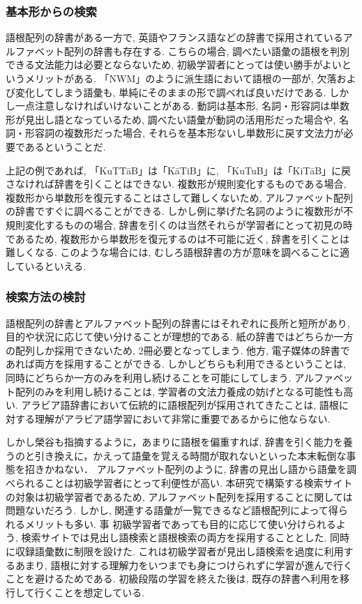 \documentclass[technicalreport]{ieicej}
\begin{document}
\subsubsection{基本形からの検索}
語根配列の辞書がある一方で, 英語やフランス語などの辞書で採用されているアルファベット配列の辞書も存在する. こちらの場合, 調べたい語彙の語根を判別できる文法能力は必要とならないため, 初級学習者にとっては使い勝手がよいというメリットがある. 「NWM」のように派生語において語根の一部が, 欠落および変化してしまう語彙も, 単純にそのままの形で調べれば良いだけである. しかし一点注意しなければいけないことがある. 動詞は基本形, 名詞・形容詞は単数形が見出し語となっているため, 調べたい語彙が動詞の活用形だった場合や, 名詞・形容詞の複数形だった場合, それらを基本形ないし単数形に戻す文法力が必要であるということだ. 

上記の例であれば, 「KuTTāB」は「KāTiB」に, 「KuTuB」は「KiTāB」に戻さなければ辞書を引くことはできない. 複数形が規則変化するものである場合, 複数形から単数形を復元することはさして難しくないため, アルファベット配列の辞書ですぐに調べることができる. しかし例に挙げた名詞のように複数形が不規則変化するものの場合, 辞書を引くのは当然それらが学習者にとって初見の時であるため, 複数形から単数形を復元するのは不可能に近く, 辞書を引くことは難しくなる. このような場合には, むしろ語根辞書の方が意味を調べることに適しているといえる. 

\subsubsection{検索方法の検討}
語根配列の辞書とアルファベット配列の辞書にはそれぞれに長所と短所があり, 目的や状況に応じて使い分けることが理想的である. 紙の辞書ではどちらか一方の配列しか採用できないため, 2冊必要となってしまう. 他方, 電子媒体の辞書であれば両方を採用することができる. しかしどちらも利用できるということは, 同時にどちらか一方のみを利用し続けることを可能にしてしまう. アルファベット配列のみを利用し続けることは, 学習者の文法力養成の妨げとなる可能性も高い. アラビア語辞書において伝統的に語根配列が採用されてきたことは, 語根に対する理解がアラビア語学習において非常に重要であるからに他ならない. 

しかし榮谷\cite{sakaedani2008}も指摘するように，あまりに語根を偏重すれば, 辞書を引く能力を養うのと引き換えに，かえって語彙を覚える時間が取れないといった本末転倒な事態を招きかねない．
アルファベット配列のように, 辞書の見出し語から語彙を調べられることは初級学習者にとって利便性が高い.
本研究で構築する検索サイトの対象は初級学習者であるため, アルファベット配列を採用することに関しては問題ないだろう.
しかし, 関連する語彙が一覧できるなど語根配列によって得られるメリットも多い. 事 初級学習者であっても目的に応じて使い分けられるよう, 検索サイトでは見出し語検索と語根検索の両方を採用することとした. 同時に収録語彙数に制限を設けた. これは初級学習者が見出し語検索を過度に利用するあまり, 語根に対する理解力をいつまでも身につけられずに学習が進んで行くことを避けるためである. 初級段階の学習を終えた後は, 既存の辞書へ利用を移行して行くことを想定している. 
\end{document}
